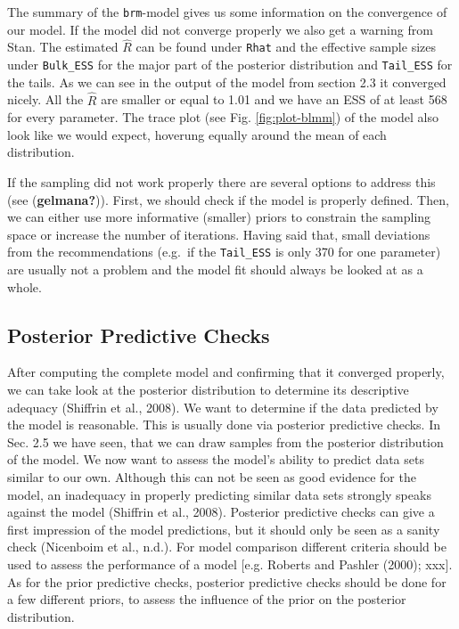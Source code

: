 \documentclass[
  doc,12pt,floatsintext]{apa7}
\begin{document}
The summary of the \texttt{brm}-model gives us some information on the convergence of our model. If the model did not converge properly we also get a warning from Stan. The estimated \(\hat{R}\) can be found under \texttt{Rhat} and the effective sample sizes under \texttt{Bulk\_ESS} for the major part of the posterior distribution and \texttt{Tail\_ESS} for the tails. As we can see in the output of the model from section 2.3 it converged nicely. All the \(\hat{R}\) are smaller or equal to 1.01 and we have an ESS of at least 568 for every parameter. The trace plot (see Fig. \ref{fig:plot-blmm}) of the model also look like we would expect, hoverung equally around the mean of each distribution.

If the sampling did not work properly there are several options to address this (see (\textbf{gelmana?})). First, we should check if the model is properly defined. Then, we can either use more informative (smaller) priors to constrain the sampling space or increase the number of iterations. Having said that, small deviations from the recommendations (e.g.~if the \texttt{Tail\_ESS} is only 370 for one parameter) are usually not a problem and the model fit should always be looked at as a whole.

\subsection{Posterior Predictive Checks}\label{posterior-predictive-checks}

After computing the complete model and confirming that it converged properly, we can take look at the posterior distribution to determine its descriptive adequacy (Shiffrin et al., 2008). We want to determine if the data predicted by the model is reasonable. This is usually done via posterior predictive checks. In Sec. 2.5 we have seen, that we can draw samples from the posterior distribution of the model. We now want to assess the model's ability to predict data sets similar to our own. Although this can not be seen as good evidence for the model, an inadequacy in properly predicting similar data sets strongly speaks against the model (Shiffrin et al., 2008). Posterior predictive checks can give a first impression of the model predictions, but it should only be seen as a sanity check (Nicenboim et al., n.d.). For model comparison different criteria should be used to assess the performance of a model {[}e.g. Roberts and Pashler (2000); xxx{]}. As for the prior predictive checks, posterior predictive checks should be done for a few different priors, to assess the influence of the prior on the posterior distribution.
\end{document}
